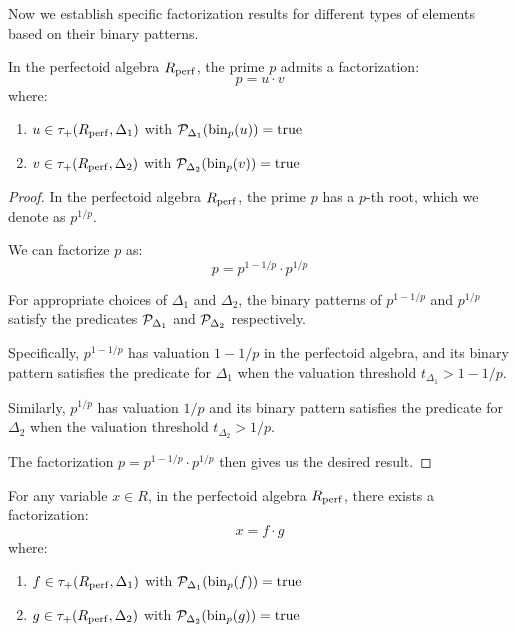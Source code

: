 Now we establish specific factorization results for different types of elements based on their binary patterns.

\begin{lemma}\label{lem:factorization-prime}
In the perfectoid algebra $R_{\operatorname{perf}}$, the prime $p$ admits a factorization:
$$p = u \cdot v$$
where:
\begin{enumerate}
    \item $u \in \tau_+(R_{\operatorname{perf}},\Delta_1)$ with $\mathcal{P}_{\Delta_1}(\operatorname{bin}_p(u)) = \text{true}$
    \item $v \in \tau_+(R_{\operatorname{perf}},\Delta_2)$ with $\mathcal{P}_{\Delta_2}(\operatorname{bin}_p(v)) = \text{true}$
\end{enumerate}
\end{lemma}

\begin{proof}
In the perfectoid algebra $R_{\operatorname{perf}}$, the prime $p$ has a $p$-th root, which we denote as $p^{1/p}$. 

We can factorize $p$ as:
$$p = p^{1-1/p} \cdot p^{1/p}$$

For appropriate choices of $\Delta_1$ and $\Delta_2$, the binary patterns of $p^{1-1/p}$ and $p^{1/p}$ satisfy the predicates $\mathcal{P}_{\Delta_1}$ and $\mathcal{P}_{\Delta_2}$ respectively.

Specifically, $p^{1-1/p}$ has valuation $1-1/p$ in the perfectoid algebra, and its binary pattern satisfies the predicate for $\Delta_1$ when the valuation threshold $t_{\Delta_1} > 1-1/p$.

Similarly, $p^{1/p}$ has valuation $1/p$ and its binary pattern satisfies the predicate for $\Delta_2$ when the valuation threshold $t_{\Delta_2} > 1/p$.

The factorization $p = p^{1-1/p} \cdot p^{1/p}$ then gives us the desired result.
\end{proof}

\begin{lemma}\label{lem:factorization-variables}
For any variable $x \in R$, in the perfectoid algebra $R_{\operatorname{perf}}$, there exists a factorization:
$$x = f \cdot g$$
where:
\begin{enumerate}
    \item $f \in \tau_+(R_{\operatorname{perf}},\Delta_1)$ with $\mathcal{P}_{\Delta_1}(\operatorname{bin}_p(f)) = \text{true}$
    \item $g \in \tau_+(R_{\operatorname{perf}},\Delta_2)$ with $\mathcal{P}_{\Delta_2}(\operatorname{bin}_p(g)) = \text{true}$
\end{enumerate}
\end{lemma}

